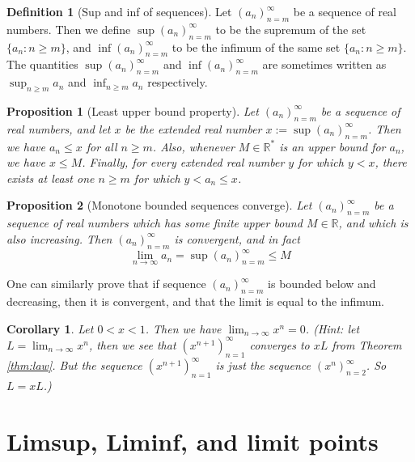 \documentclass[
]{book}
\newtheorem{corollary}{Corollary}[chapter]
\newtheorem{proposition}{Proposition}[chapter]
\theoremstyle{definition}
\newtheorem{definition}{Definition}[chapter]
\theoremstyle{definition}
\theoremstyle{definition}
\theoremstyle{definition}
\theoremstyle{remark}
\begin{document}
\begin{definition}[Sup and inf of sequences]
Let \((a_n)_{n=m}^{\infty}\) be a sequence of real numbers. Then we define \(\sup(a_n)_{n=m}^{\infty}\) to be the supremum of the set \(\{a_n:n\geq m\}\), and \(\inf(a_n)_{n=m}^{\infty}\) to be the infimum of the same set \(\{a_n:n\geq m\}\). The quantities \(\sup(a_n)_{n=m}^{\infty}\) and \(\inf(a_n)_{n=m}^{\infty}\) are sometimes written as \(\sup_{n\geq m}a_n\) and \(\inf_{n\geq m}a_n\) respectively.
\end{definition}

\begin{proposition}[Least upper bound property]
Let \((a_n)_{n=m}^{\infty}\) be a sequence of real numbers, and let \(x\) be the extended real number \(x:=\sup(a_n)_{n=m}^{\infty}\). Then we have \(a_n\leq x\) for all \(n\geq m\). Also, whenever \(M \in \mathbb{R}^{\ast}\) is an upper bound for \(a_n\), we have \(x\leq M\). Finally, for every extended real number \(y\) for which \(y<x\), there exists at least one \(n\geq m\) for which \(y< a_n\leq x\).
\end{proposition}

\begin{proposition}[Monotone bounded sequences converge]
Let \((a_n)_{n=m}^{\infty}\) be a sequence of real numbers which has some finite upper bound \(M \in \mathbb{R}\), and which is also increasing. Then \((a_n)_{n=m}^{\infty}\) is convergent, and in fact
\[
\lim_{n\to\infty}a_n=\sup (a_n)_{n=m}^{\infty} \leq M
\]
\end{proposition}

One can similarly prove that if sequence \((a_n)_{n=m}^{\infty}\) is bounded below and decreasing, then it is convergent, and that the limit is equal to the infimum.

\begin{corollary}
Let \(0<x<1\). Then we have \(\lim_{n\to \infty}x^n=0\). (Hint: let \(L =\lim_{n\to \infty}x^n\), then we see that \((x^{n+1})_{n=1}^{\infty}\) converges to \(xL\) from Theorem \ref{thm:law}. But the sequence \((x^{n+1})_{n=1}^{\infty}\) is just the sequence \((x^{n})_{n=2}^{\infty}\). So \(L=xL\).)
\end{corollary}

\section{Limsup, Liminf, and limit points}\label{limsup-liminf-and-limit-points}
\end{document}
